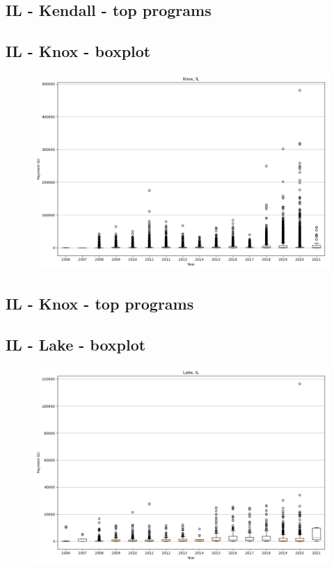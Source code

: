 \subsection*{IL - Kendall - top programs}

\newpage
\subsection*{IL - Knox - boxplot}
\begin{figure}[h]
\centering
\includegraphics[width=7in]{../output/boxplots/counties/Knox-IL_boxplot.png}
\end{figure}


\subsection*{IL - Knox - top programs}

\newpage
\subsection*{IL - Lake - boxplot}
\begin{figure}[h]
\centering
\includegraphics[width=7in]{../output/boxplots/counties/Lake-IL_boxplot.png}
\end{figure}


